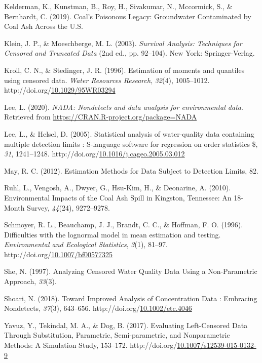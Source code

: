 \documentclass[12pt, twoside]{amherstthesis}
\newenvironment{CSLReferences}%
  {}%
  {\par}
\begin{document}
\begin{CSLReferences}{1}{0}
\leavevmode\hypertarget{ref-Kelderman2019}{}%
Kelderman, K., Kunstman, B., Roy, H., Sivakumar, N., Mccormick, S., \& Bernhardt, C. (2019). {Coal's Poisonous Legacy: Groundwater Contaminated by Coal Ash Across the U.S.}

\leavevmode\hypertarget{ref-Klein2003}{}%
Klein, J. P., \& Moeschberge, M. L. (2003). \emph{{Survival Analysis: Techniques for Censored and Truncated Data}} (2nd ed., pp. 92--104). New York: Springer-Verlag.

\leavevmode\hypertarget{ref-Kroll1996}{}%
Kroll, C. N., \& Stedinger, J. R. (1996). {Estimation of moments and quantiles using censored data}. \emph{Water Resources Research}, \emph{32}(4), 1005--1012. http://doi.org/\href{https://doi.org/10.1029/95WR03294}{10.1029/95WR03294}

\leavevmode\hypertarget{ref-NADA}{}%
Lee, L. (2020). \emph{NADA: Nondetects and data analysis for environmental data}. Retrieved from \url{https://CRAN.R-project.org/package=NADA}

\leavevmode\hypertarget{ref-Lee2005}{}%
Lee, L., \& Helsel, D. (2005). {Statistical analysis of water-quality data containing multiple detection limits : S-language software for regression on order statistics {\$}}, \emph{31}, 1241--1248. http://doi.org/\href{https://doi.org/10.1016/j.cageo.2005.03.012}{10.1016/j.cageo.2005.03.012}

\leavevmode\hypertarget{ref-May2012}{}%
May, R. C. (2012). {Estimation Methods for Data Subject to Detection Limits}, 82.

\leavevmode\hypertarget{ref-Ruhl2010}{}%
Ruhl, L., Vengosh, A., Dwyer, G., Hsu-Kim, H., \& Deonarine, A. (2010). {Environmental Impacts of the Coal Ash Spill in Kingston, Tennessee: An 18-Month Survey}, \emph{44}(24), 9272--9278.

\leavevmode\hypertarget{ref-Schmoyer1996}{}%
Schmoyer, R. L., Beauchamp, J. J., Brandt, C. C., \& Hoffman, F. O. (1996). {Difficulties with the lognormal model in mean estimation and testing}. \emph{Environmental and Ecological Statistics}, \emph{3}(1), 81--97. http://doi.org/\href{https://doi.org/10.1007/bf00577325}{10.1007/bf00577325}

\leavevmode\hypertarget{ref-She1997}{}%
She, N. (1997). {Analyzing Censored Water Quality Data Using a Non-Parametric Approach}, \emph{33}(3).

\leavevmode\hypertarget{ref-Shoari2018}{}%
Shoari, N. (2018). {Toward Improved Analysis of Concentration Data : Embracing Nondetects}, \emph{37}(3), 643--656. http://doi.org/\href{https://doi.org/10.1002/etc.4046}{10.1002/etc.4046}

\leavevmode\hypertarget{ref-Yavuz2017}{}%
Yavuz, Y., Tekindal, M. A., \& Dog, B. (2017). {Evaluating Left-Censored Data Through Substitution, Parametric, Semi-parametric, and Nonparametric Methods: A Simulation Study}, 153--172. http://doi.org/\href{https://doi.org/10.1007/s12539-015-0132-9}{10.1007/s12539-015-0132-9}

\end{CSLReferences}
\end{document}
